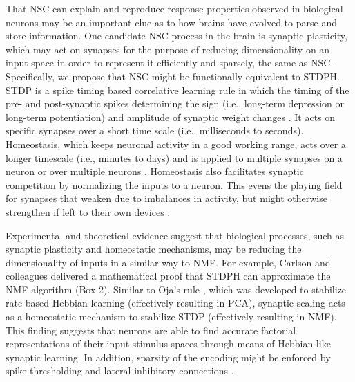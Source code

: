 That \ac{NSC} can explain and reproduce response properties observed in biological neurons may be an important clue as to how brains have evolved to parse and store information. One candidate \ac{NSC} process in the brain is synaptic plasticity, 
which may act on synapses for the purpose of reducing dimensionality on an input space in order to represent it efficiently and sparsely, the same as \ac{NSC}. Specifically, we
propose that \ac{NSC} might be functionally equivalent to \ac{STDPH}. STDP is a spike timing based correlative learning rule in which the
timing of the pre- and post-synaptic spikes determining the sign
(i.e., long-term depression or long-term potentiation)
and amplitude of synaptic weight changes \citep{BiPoo1998,SongAbbott2000}.
It acts on specific synapses over a short time scale 
(i.e., milliseconds to seconds). Homeostasis, which keeps neuronal activity in a good working range, acts over a longer timescale (i.e., minutes to days) and is applied to multiple synapses on a neuron or over multiple neurons \citep{turrigiano1998}.  Homeostasis also facilitates synaptic competition by normalizing the inputs to a neuron. This evens the playing field for synapses that weaken due to imbalances in activity, but might otherwise strengthen if left to their own devices \citep{chistiakova2015}.

Experimental and theoretical evidence suggest that biological processes, such as synaptic plasticity and homeostatic mechanisms, may be reducing the dimensionality of inputs in a similar way to NMF. For example, Carlson and colleagues \citep{Carlson2013} delivered a mathematical proof
that \ac{STDPH} can approximate the \ac{NMF} algorithm (Box 2).
Similar to Oja's rule \citep{Oja1982}, which was developed to stabilize 
rate-based Hebbian learning
(effectively resulting in \ac{PCA}),
synaptic scaling acts as a homeostatic mechanism to stabilize \ac{STDP}
(effectively resulting in \ac{NMF}).
This finding suggests that neurons are able to find accurate factorial
representations of their input stimulus spaces through means of Hebbian-like
synaptic learning. In addition, sparsity of the encoding might be enforced by spike thresholding \citep{Rozell2008}
and lateral inhibitory connections \citep{Coultrip1992}.

